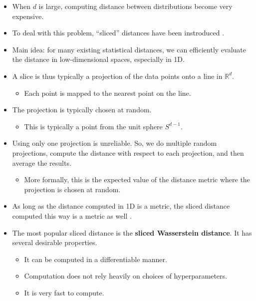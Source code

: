 \documentclass[10pt]{article}
\newcommand{\Real}{\mathbb{R}}
\begin{document}
\begin{itemize}
    \item When $d$ is large, computing distance between distributions become very expensive.
    
    \item To deal with this problem, ``sliced'' distances have been instroduced \cite{Kolouri:2019, Nadjahi:2022, Goldfeld:2021}.
    
    \item Main idea: for many existing statistical distances, we can efficiently evaluate the distance in low-dimensional spaces, especially in 1D.
    
    \item A slice is thus typically a projection of the data points onto a line in $\Real^d$.
    \begin{itemize}
        \item Each point is mapped to the nearest point on the line.
    \end{itemize}

    \item The projection is typically chosen at random.
    \begin{itemize}
        \item This is typically a point from the unit sphere $S^{d-1}$.
    \end{itemize}

    \item Using only one projection is unreliable. So, we do multiple random projections, compute the distance with respect to each projection, and then average the results.
    
    \begin{itemize}
        \item More formally, this is the expected value of the distance metric where the projection is chosen at random.        
    \end{itemize}
        
    \item As long as the distance computed in 1D is a metric, the sliced distance computed this way is a metric as well \cite{Nadjahi:2022}.    
    
    \item The most popular sliced distance is the {\bf sliced Wasserstein distance}. It has several desirable properties.
    \begin{itemize}
        \item It can be computed in a differentiable manner.
        \item Computation does not rely heavily on choices of hyperparameters.
        \item It is very fast to compute.
    \end{itemize}


\end{itemize}
\end{document}
